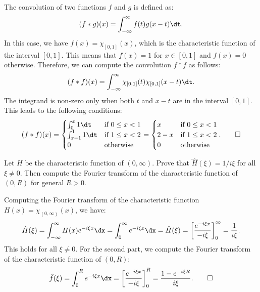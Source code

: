 \begin{solution}
  The convolution of two functions $f$ and $g$ is defined as:
  \[%
    (f * g)(x) = \int_{-\infty}^{\infty} f(t) g(x - t) \dt
  .\]%
  In this case, we have $f(x) = \chi_{[0, 1]}(x)$, which is the characteristic function of the interval $[0, 1]$. This means that $f(x) = 1$ for $x \in [0, 1]$ and $f(x) = 0$ otherwise. Therefore, we can compute the convolution $f * f$ as follows:
  \[%
    (f * f)(x) = \int_{-\infty}^{\infty} \chi_{[0, 1]}(t) \chi_{[0, 1]}(x - t) \dt
  .\]%
  The integrand is non-zero only when both $t$ and $x - t$ are in the interval $[0, 1]$. This leads to the following conditions:
  \[%
    (f * f)(x) = \begin{cases}
      \int_0^x 1 \dt & \text{if}~0 \leq x < 1 \\
      \int_{x-1}^1 1 \dt & \text{if } 1 \leq x < 2 \\
      0 & \text{otherwise} \\
    \end{cases}
    = \begin{cases}
      x & \text{if}~0 \leq x < 1 \\
      2 - x & \text{if } 1 \leq x < 2 \\
      0 & \text{otherwise} \\
    \end{cases}
  .\qedhere\]%
\end{solution}

\begin{problem}[12]
  Let $H$ be the characteristic function of $(0, \infty)$. Prove that $\hat{H}(\xi) = 1/i\xi$ for all $\xi \neq 0$. Then compute the Fourier transform of the characteristic function of $(0, R)$ for general $R > 0$.
\end{problem}

\begin{solution}
  Computing the Fourier transform of the characteristic function $H(x) = \chi_{(0, \infty)}(x)$, we have:
  \[%
    \hat{H}(\xi) = \int_{-\infty}^{\infty} H(x) e^{-i \xi x} \dx = \int_0^{\infty} e^{-i \xi x} \dx = \hat{H}(\xi) = \left[ \frac{e^{-i \xi x}}{-i \xi} \right]_0^{\infty} = \frac{1}{i \xi}
  .\]%
  This holds for all $\xi \neq 0$. For the second part, we compute the Fourier transform of the characteristic function of $(0, R)$:
  \[%
    \hat{f}(\xi) = \int_0^R e^{-i \xi x} \dx = \left[ \frac{e^{-i \xi x}}{-i \xi} \right]_0^R = \frac{1 - e^{-i \xi R}}{i \xi}
  .\qedhere\]%
\end{solution}

